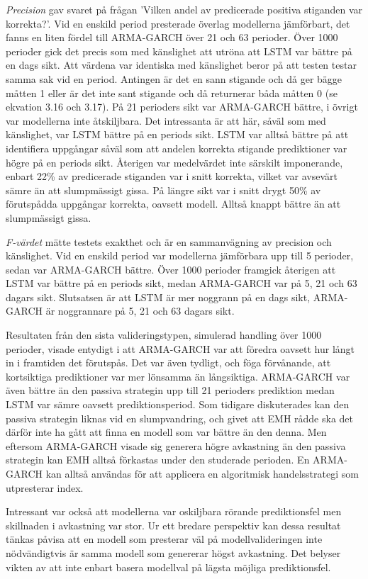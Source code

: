 \documentclass[11pt]{article}
\numberwithin{equation}{section}
\numberwithin{table}{section}
\numberwithin{figure}{section}
\begin{document}
\textit{Precision} gav svaret på frågan 'Vilken andel av predicerade positiva stiganden var korrekta?'. Vid en enskild period presterade överlag modellerna jämförbart, det fanns en liten fördel till ARMA-GARCH över 21 och 63 perioder. Över 1000 perioder gick det precis som med känslighet att utröna att LSTM var bättre på en dags sikt. Att värdena var identiska med känslighet beror på att testen testar samma sak vid en period. Antingen är det en sann stigande och då ger bägge måtten 1 eller är det inte sant stigande och då returnerar båda måtten 0 (se ekvation 3.16 och 3.17). På 21 perioders sikt var ARMA-GARCH bättre, i övrigt var modellerna inte åtskiljbara. Det intressanta är att här, såväl som med känslighet, var LSTM bättre på en periods sikt. LSTM var alltså bättre på att identifiera uppgångar såväl som att andelen korrekta stigande prediktioner var högre på en periods sikt. Återigen var medelvärdet inte särskilt imponerande, enbart 22\% av predicerade stiganden var i snitt korrekta, vilket var avsevärt sämre än att slumpmässigt gissa. På längre sikt var i snitt drygt 50\% av förutspådda uppgångar korrekta, oavsett modell. Alltså knappt bättre än att slumpmässigt gissa. 

\textit{F-värdet} mätte testets exakthet och är en sammanvägning av precision och känslighet. Vid en enskild period var modellerna jämförbara upp till 5 perioder, sedan var ARMA-GARCH bättre. Över 1000 perioder framgick återigen att LSTM var bättre på en periods sikt, medan ARMA-GARCH var på 5, 21 och 63 dagars sikt. Slutsatsen är att LSTM är mer noggrann på en dags sikt, ARMA-GARCH är noggrannare på 5, 21 och 63 dagars sikt. 

Resultaten från den sista valideringstypen, simulerad handling över 1000 perioder, visade entydigt i att ARMA-GARCH var att föredra oavsett hur långt in i framtiden det förutspås. Det var även tydligt, och föga förvånande, att kortsiktiga prediktioner var mer lönsamma än långsiktiga. ARMA-GARCH var även bättre än den passiva strategin upp till 21 perioders prediktion medan LSTM var sämre oavsett prediktionsperiod. Som tidigare diskuterades kan den passiva strategin liknas vid en slumpvandring, och givet att EMH rådde ska det därför inte ha gått att finna en modell som var bättre än den denna. Men eftersom ARMA-GARCH visade sig generera högre avkastning än den passiva strategin kan EMH alltså förkastas under den studerade perioden. En ARMA-GARCH kan alltså användas för att applicera en algoritmisk handelsstrategi som utpresterar index. 

Intressant var också att modellerna var oskiljbara rörande prediktionsfel men skillnaden i avkastning var stor. Ur ett bredare perspektiv kan dessa resultat tänkas påvisa att en modell som presterar väl på modellvalideringen inte nödvändigtvis är samma modell som genererar högst avkastning. Det belyser vikten av att inte enbart basera modellval på lägsta möjliga prediktionsfel. 
\end{document}
